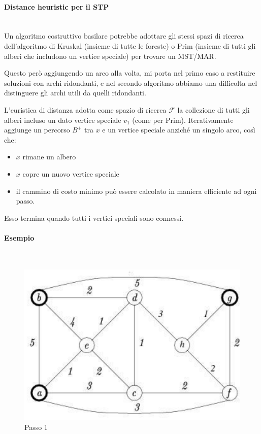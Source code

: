 \documentclass{article}
\begin{document}
\paragraph{Distance heuristic per il STP}\mbox{}\\
Un algoritmo costruttivo basilare potrebbe adottare gli stessi spazi di ricerca dell'algoritmo
di Kruskal (insieme di tutte le foreste) o Prim (insieme di tutti gli alberi
che includono un vertice speciale) per trovare un MST/MAR.

Questo però aggiungendo un arco alla volta, mi porta nel primo caso a restituire soluzioni
con archi ridondanti, e nel secondo algoritmo abbiamo una difficolta nel distinguere gli archi
utili da quelli ridondanti.

L'euristica di distanza adotta come spazio di ricerca $\mathcal{F}$ la collezione di tutti gli
alberi incluso un dato vertice speciale $v_1$ (come per Prim). Iterativamente aggiunge un percorso
$B^+$ tra $x$ e un vertice speciale anziché un singolo arco, così che:
\begin{itemize}
    \item $x$ rimane un albero
    \item $x$ copre un nuovo vertice speciale
    \item il cammino di costo minimo può essere calcolato in maniera efficiente ad ogni passo.
\end{itemize}
Esso termina quando tutti i vertici speciali sono connessi.

\paragraph{Esempio}\mbox{}\\
\begin{figure}[H]
    \centering
    \includegraphics[scale=0.5 ]{images/examp0.png}
    \caption{Passo 1}
    \label{fig:exam_0_d}
\end{figure}
\end{document}
